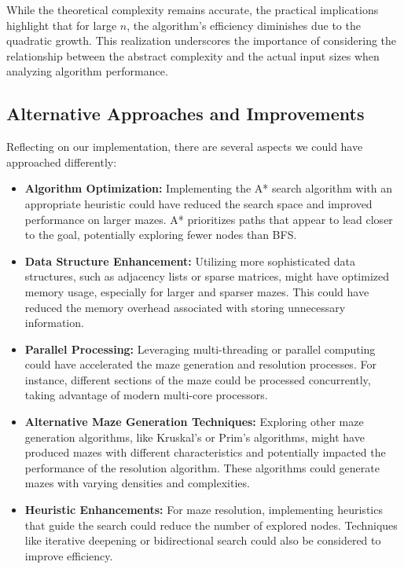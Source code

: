 \documentclass{article}
\begin{document}
While the theoretical complexity remains accurate, the practical implications highlight that for large \(n\), the algorithm's efficiency diminishes due to the quadratic growth. This realization underscores the importance of considering the relationship between the abstract complexity and the actual input sizes when analyzing algorithm performance.

\subsection*{Alternative Approaches and Improvements}

Reflecting on our implementation, there are several aspects we could have approached differently:

\begin{itemize}
    \item \textbf{Algorithm Optimization:} Implementing the A* search algorithm with an appropriate heuristic could have reduced the search space and improved performance on larger mazes. A* prioritizes paths that appear to lead closer to the goal, potentially exploring fewer nodes than BFS.

    \item \textbf{Data Structure Enhancement:} Utilizing more sophisticated data structures, such as adjacency lists or sparse matrices, might have optimized memory usage, especially for larger and sparser mazes. This could have reduced the memory overhead associated with storing unnecessary information.

    \item \textbf{Parallel Processing:} Leveraging multi-threading or parallel computing could have accelerated the maze generation and resolution processes. For instance, different sections of the maze could be processed concurrently, taking advantage of modern multi-core processors.

    \item \textbf{Alternative Maze Generation Techniques:} Exploring other maze generation algorithms, like Kruskal's or Prim's algorithms, might have produced mazes with different characteristics and potentially impacted the performance of the resolution algorithm. These algorithms could generate mazes with varying densities and complexities.

    \item \textbf{Heuristic Enhancements:} For maze resolution, implementing heuristics that guide the search could reduce the number of explored nodes. Techniques like iterative deepening or bidirectional search could also be considered to improve efficiency.

\end{itemize}
\end{document}
